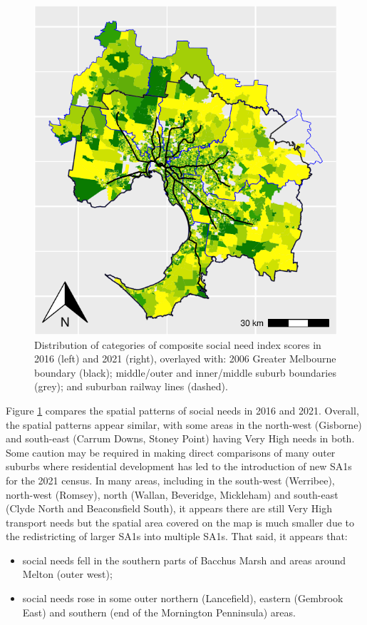 \documentclass[preprint, 3p,
authoryear]{elsarticle} %
\providecommand{\tightlist}{%
  \setlength{\itemsep}{0pt}\setlength{\parskip}{0pt}}
\begin{document}
\begin{figure}
\includegraphics[width=0.9\linewidth]{Leveraging_GTFS_to_assess_transit_supply_Transport_Geography_files/figure-latex/Greater_Melbourne_2016_social_needs_appendix-1} \caption{Distribution of categories of composite social need index scores in 2016 (left) and 2021 (right), overlayed with: 2006 Greater Melbourne boundary (black); middle/outer and inner/middle suburb boundaries (grey); and suburban railway lines (dashed).}\label{fig:Greater_Melbourne_2016_social_needs_appendix}
\end{figure}

Figure \ref{fig:Greater_Melbourne_2016_social_needs_appendix} compares
the spatial patterns of social needs in 2016 and 2021. Overall, the
spatial patterns appear similar, with some areas in the north-west
(Gisborne) and south-east (Carrum Downs, Stoney Point) having Very High
needs in both. Some caution may be required in making direct comparisons
of many outer suburbs where residential development has led to the
introduction of new SA1s for the 2021 census. In many areas, including
in the south-west (Werribee), north-west (Romsey), north (Wallan,
Beveridge, Mickleham) and south-east (Clyde North and Beaconsfield
South), it appears there are still Very High transport needs but the
spatial area covered on the map is much smaller due to the redistricting
of larger SA1s into multiple SA1s. That said, it appears that:

\begin{itemize}
\tightlist
\item
  social needs fell in the southern parts of Bacchus Marsh and areas
  around Melton (outer west);
\item
  social needs rose in some outer northern (Lancefield), eastern
  (Gembrook East) and southern (end of the Mornington Penninsula) areas.
\end{itemize}


\end{document}
